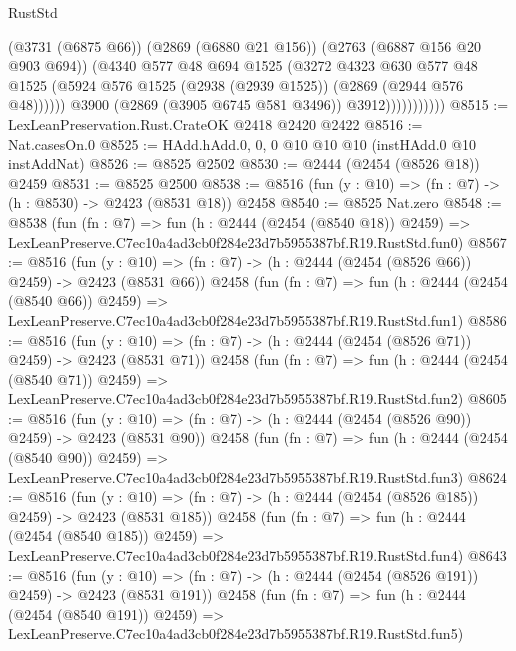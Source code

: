\begin{lexlean}{RustStd}
\begin{coremodule}
                            (@3731 (@6875 @66))
                            (@2869 (@6880 @21 @156))
                            (@2763 (@6887 @156 @20 @903 @694))
                            (@4340
                              @577
                              @48
                              @694
                              @1525
                              (@3272
                                @4323
                                @630
                                @577
                                @48
                                @1525
                                (@5924 @576 @1525 (@2938 (@2939 @1525)) (@2869 (@2944 @576 @48))))))
                          @3900
                          (@2869 (@3905 @6745 @581 @3496))
                          @3912)))))))))))
@8515 := LexLeanPreservation.Rust.CrateOK @2418 @2420 @2422
@8516 := Nat.casesOn.{0}
@8525 := HAdd.hAdd.{0, 0, 0} @10 @10 @10 (instHAdd.{0} @10 instAddNat)
@8526 := @8525 @2502
@8530 := @2444 (@2454 (@8526 @18)) @2459
@8531 := @8525 @2500
@8538 := @8516 (fun (y : @10) => (fn : @7) -> (h : @8530) -> @2423 (@8531 @18)) @2458
@8540 := @8525 Nat.zero
@8548 := @8538
    (fun (fn : @7) =>
    fun (h : @2444 (@2454 (@8540 @18)) @2459) =>
    LexLeanPreserve.C7ec10a4ad3cb0f284e23d7b5955387bf.R19.RustStd.fun0)
@8567 := @8516
    (fun (y : @10) => (fn : @7) -> (h : @2444 (@2454 (@8526 @66)) @2459) -> @2423 (@8531 @66))
    @2458
    (fun (fn : @7) =>
    fun (h : @2444 (@2454 (@8540 @66)) @2459) =>
    LexLeanPreserve.C7ec10a4ad3cb0f284e23d7b5955387bf.R19.RustStd.fun1)
@8586 := @8516
    (fun (y : @10) => (fn : @7) -> (h : @2444 (@2454 (@8526 @71)) @2459) -> @2423 (@8531 @71))
    @2458
    (fun (fn : @7) =>
    fun (h : @2444 (@2454 (@8540 @71)) @2459) =>
    LexLeanPreserve.C7ec10a4ad3cb0f284e23d7b5955387bf.R19.RustStd.fun2)
@8605 := @8516
    (fun (y : @10) => (fn : @7) -> (h : @2444 (@2454 (@8526 @90)) @2459) -> @2423 (@8531 @90))
    @2458
    (fun (fn : @7) =>
    fun (h : @2444 (@2454 (@8540 @90)) @2459) =>
    LexLeanPreserve.C7ec10a4ad3cb0f284e23d7b5955387bf.R19.RustStd.fun3)
@8624 := @8516
    (fun (y : @10) => (fn : @7) -> (h : @2444 (@2454 (@8526 @185)) @2459) -> @2423 (@8531 @185))
    @2458
    (fun (fn : @7) =>
    fun (h : @2444 (@2454 (@8540 @185)) @2459) =>
    LexLeanPreserve.C7ec10a4ad3cb0f284e23d7b5955387bf.R19.RustStd.fun4)
@8643 := @8516
    (fun (y : @10) => (fn : @7) -> (h : @2444 (@2454 (@8526 @191)) @2459) -> @2423 (@8531 @191))
    @2458
    (fun (fn : @7) =>
    fun (h : @2444 (@2454 (@8540 @191)) @2459) =>
    LexLeanPreserve.C7ec10a4ad3cb0f284e23d7b5955387bf.R19.RustStd.fun5)

\end{coremodule}
\end{lexlean}
